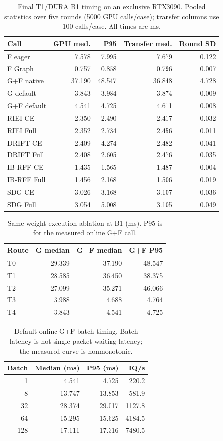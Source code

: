 \begin{table}[t]
\centering\scriptsize
\caption{Final T1/DURA B1 timing on an exclusive RTX3090. Pooled statistics over five rounds (5000 GPU calls/case); transfer columns use 100 calls/case. All times are ms.}
\label{tab:final-t1-latency}
\begin{tabular}{lrrrr}
\toprule
Call & GPU med. & P95 & Transfer med. & Round SD\\
\midrule
F eager & 7.578 & 7.995 & 7.679 & 0.122\\
F Graph & 0.757 & 0.858 & 0.796 & 0.007\\
G+F native & 37.190 & 48.547 & 36.848 & 4.728\\
G default & 3.843 & 3.984 & 3.874 & 0.009\\
G+F default & 4.541 & 4.725 & 4.611 & 0.008\\
RIEI CE & 2.350 & 2.490 & 2.417 & 0.032\\
RIEI Full & 2.352 & 2.734 & 2.456 & 0.011\\
DRIFT CE & 2.409 & 4.274 & 2.482 & 0.041\\
DRIFT Full & 2.408 & 2.605 & 2.476 & 0.035\\
IB-RFF CE & 1.435 & 1.565 & 1.487 & 0.004\\
IB-RFF Full & 1.456 & 2.168 & 1.506 & 0.019\\
SDG CE & 3.026 & 3.168 & 3.107 & 0.036\\
SDG Full & 3.054 & 5.008 & 3.105 & 0.049\\
\bottomrule
\end{tabular}
\end{table}
\begin{table}[t]
\centering\footnotesize
\caption{Same-weight execution ablation at B1 (ms). P95 is for the measured online G+F call.}
\label{tab:final-t1-routes}
\begin{tabular}{lrrr}
\toprule
Route & G median & G+F median & G+F P95\\
\midrule
T0 & 29.339 & 37.190 & 48.547\\
T1 & 28.585 & 36.450 & 38.375\\
T2 & 27.099 & 35.271 & 46.066\\
T3 & 3.988 & 4.688 & 4.764\\
T4 & 3.843 & 4.541 & 4.725\\
\bottomrule
\end{tabular}
\end{table}
\begin{table}[t]
\centering\footnotesize
\caption{Default online G+F batch timing. Batch latency is not single-packet waiting latency; the measured curve is nonmonotonic.}
\label{tab:final-t1-batches}
\begin{tabular}{rrrr}
\toprule
Batch & Median (ms) & P95 (ms) & IQ/s\\
\midrule
1 & 4.541 & 4.725 & 220.2\\
8 & 13.747 & 13.853 & 581.9\\
32 & 28.374 & 29.017 & 1127.8\\
64 & 15.295 & 15.625 & 4184.5\\
128 & 17.111 & 17.316 & 7480.5\\
\bottomrule
\end{tabular}
\end{table}
